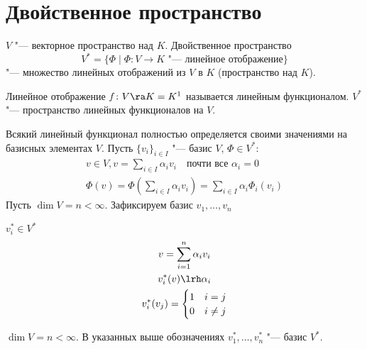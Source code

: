 ﻿\section{Двойственное пространство}

\begin{Def}
	$V$ "--- векторное пространство над $K$. Двойственное пространство
	\[ V^* = \{\Phi \mid \text{$\Phi\colon V \to K$ "--- линейное отображение}\} \]
	"--- множество линейных отображений из $V$ в $K$ (пространство над $K$).
\end{Def}
\begin{Def}
	Линейное отображение $f\colon V \ra K = K^1$ называется линейным функционалом.
	$V^*$ "--- пространство линейных функционалов на $V$.
\end{Def}

\begin{Rem}
	Всякий линейный функционал полностью определяется своими значениями на базисных элементах $V$.
	Пусть $\{v_i\}_{i \in I}$ "--- базис $V$, $\Phi \in V^*$:
	\begin{gather*}
		v \in V, v = \sum_{i \in I}\alpha_i v_i \quad \text{почти все $\alpha_i = 0$} \\
		\Phi(v) = \Phi \left(\sum_{i \in I}\alpha_i v_i\right) = \sum_{i \in I}\alpha_i\Phi_i(v_i)
	\end{gather*}
	Пусть $\dim V = n < \infty$. Зафиксируем базис $v_1, \dots, v_n$
\end{Rem}

$v_i^* \in V^*$
\begin{gather*}
	v = \sum_{i=1}^n \alpha_i v_i \\
	v_i^*(v) \lrh \alpha_i \\
	v_i^*(v_j) = \begin{cases}
		1 & i = j \\
		0 & i \ne j
	\end{cases}
\end{gather*}

\begin{theorem}
	$\dim V = n < \infty$.
	В указанных выше обозначениях $v_1^*, \dots, v_n^*$ "--- базис $V^*$.
\end{theorem}

